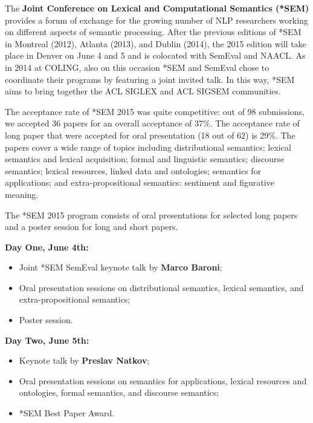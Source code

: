 \setlength{\parskip}{.7ex}
\vspace*{0.5cm}


The {\bf Joint Conference on Lexical and Computational Semantics (*SEM)} provides a forum of exchange for the growing number of NLP researchers working on different aspects of semantic processing.
After the previous editions of *SEM in Montreal (2012), Atlanta (2013), and Dublin (2014), the 2015 edition will take place in Denver on June 4 and 5 and is colocated with SemEval and NAACL. As in 2014 at COLING, also on this occasion *SEM and SemEval chose to coordinate their programs by featuring a joint invited talk.
In this way, *SEM aims to bring together the ACL SIGLEX and ACL SIGSEM communities.

The acceptance rate of *SEM 2015 was quite competitive: out of 98 submissions,
we accepted 36 papers for an overall acceptance of 37\%. The acceptance rate of long paper that were accepted for oral presentation (18 out of 62) is 29\%. The papers cover a wide range of topics including distributional
semantics; lexical semantics and lexical acquisition; formal and linguistic semantics; discourse semantics;
lexical resources, linked data and ontologies; semantics for applications; and extra-propositional semantics: sentiment and figurative meaning.

The *SEM 2015 program consists of oral presentations for selected long papers and a poster session for long and short papers.

\vspace{1mm}

{\bf Day One, June 4th:}
\begin{itemize}
  \item Joint *SEM SemEval keynote talk by {\bf Marco Baroni};
  \item Oral presentation sessions on distributional semantics, lexical semantics, and extra-propositional semantics;
  \item Poster session.
\end{itemize}

{\bf Day Two, June 5th:}
\begin{itemize}
  \item Keynote talk by {\bf Preslav Natkov};
  \item Oral presentation sessions on semantics for applications, lexical resources and ontologies, formal semantics, and discourse semantics;
  \item *SEM Best Paper Award.
\end{itemize}

